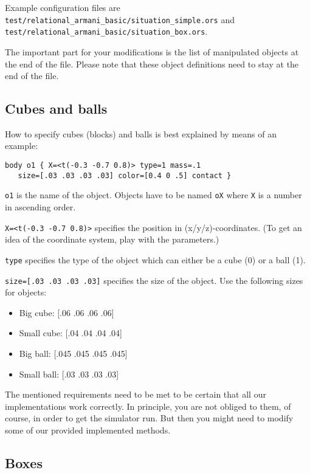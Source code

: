 \documentclass[10pt,twoside,twocolumn,fleqn]{article}
\begin{document}
Example configuration files are
\texttt{test/relational\_armani\_basic/situation\_simple.ors} and
\texttt{test/relational\_armani\_basic/situation\_box.ors}.

The important part for your modifications is the list of manipulated
objects at the end of the file. Please note that these object
definitions need to stay at the end of the file.

\subsection{Cubes and balls}

How to specify cubes (blocks) and balls is best explained by means of an
example:

\begin{lstlisting}
body o1 { X=<t(-0.3 -0.7 0.8)> type=1 mass=.1
   size=[.03 .03 .03 .03] color=[0.4 0 .5] contact }
\end{lstlisting}

\texttt{o1} is the name of the object. Objects have to be named \texttt{oX}
where \texttt{X} is a number in ascending order.

\texttt{X=<t(-0.3 -0.7 0.8)>} specifies the position in (x/y/z)-coordinates.
(To get an idea of the coordinate system, play with the parameters.)

\texttt{type} specifies the type of the object which can either be a cube (0) or
a ball (1).

\texttt{size=[.03 .03 .03 .03]} specifies the size of the object. Use the
following sizes for objects:
\begin{itemize}
  \item Big cube: [.06 .06 .06 .06]
  \item Small cube: [.04 .04 .04 .04]
  \item Big ball: [.045 .045 .045 .045]
  \item Small ball: [.03 .03 .03 .03]
\end{itemize}

The mentioned requirements need to be met to be certain that all our
implementations work correctly. In principle, you are not obliged to
them, of course, in order to get the simulator run. But then you might
need to modify some of our provided implemented methods.


\subsection{Boxes}
\end{document}
